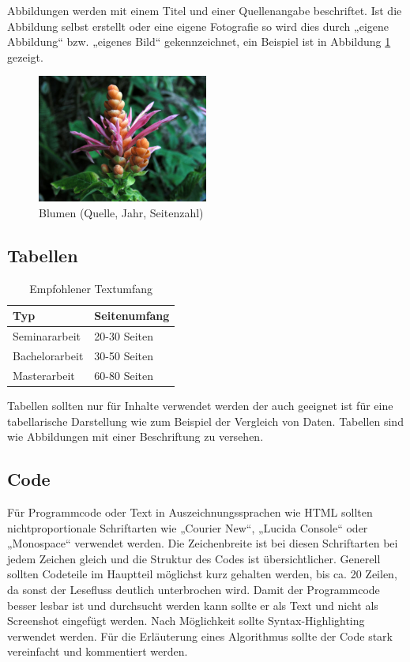 Abbildungen werden mit einem Titel und einer Quellenangabe beschriftet.
Ist die Abbildung selbst erstellt oder eine eigene Fotografie so wird dies durch „eigene Abbildung“ bzw. „eigenes Bild“ gekennzeichnet, ein Beispiel ist in Abbildung \ref{fig:abbildung} gezeigt.

\begin{figure}
	\centering
	\includegraphics[width=0.5\textwidth]{images/blume}
	\caption{Blumen (Quelle, Jahr, Seitenzahl)}
	\label{fig:abbildung}
\end{figure}

\subsection{Tabellen}\label{subsubsec:tabellen}

{\renewcommand{\arraystretch}{1.5}
\begin{table}[h!]
\centering
\begin{tabular}{ l|l } 
\hline
\bfseries Typ & \bfseries Seitenumfang\\
\hline
Seminararbeit & 20-30 Seiten \\
Bachelorarbeit & 30-50 Seiten \\
Masterarbeit & 60-80 Seiten \\
\hline
\end{tabular}
\caption{Empfohlener Textumfang}
\label{table:textumfang}
\end{table}}

Tabellen sollten nur für Inhalte verwendet werden der auch geeignet ist für eine tabellarische Darstellung wie zum Beispiel der Vergleich von Daten.
Tabellen sind wie Abbildungen mit einer Beschriftung zu versehen.

\subsection{Code}\label{subsubsec:code}

Für Programmcode oder Text in Auszeichnungssprachen wie HTML sollten nichtproportionale Schriftarten wie „Courier New“, „Lucida Console“ oder „Monospace“ verwendet werden.
Die Zeichenbreite ist bei diesen Schriftarten bei jedem Zeichen gleich und die Struktur des Codes ist übersichtlicher.
Generell sollten Codeteile im Hauptteil möglichst kurz gehalten werden, bis ca. 20 Zeilen, da sonst der Lesefluss deutlich unterbrochen wird.
Damit der Programmcode besser lesbar ist und durchsucht werden kann sollte er als Text und nicht als Screenshot eingefügt werden.
Nach Möglichkeit sollte Syntax-Highlighting verwendet werden.
Für die  Erläuterung eines Algorithmus sollte der Code stark vereinfacht und kommentiert werden.


